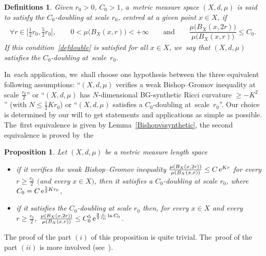 \documentclass[10pt,a4paper]{amsart}
\numberwithin{equation}{section}
\newtheorem{prop}[theor]{Proposition}
\newtheorem{defis}[theor]{Definitions}
\begin{document}
\begin{defis}%
Given $r_0 > 0$, $C_0 > 1$, a~metric measure space $(X,d, \mu)$ is said to satisfy the $C_0$-doubling at scale $r_0$, centred at a given point $x \in X$, if
\begin{gather}\label{defdouble}
\forall r \in \bigg[\frac{1}{2} r_0, \frac{5}{2} r_0\bigg], \qquad
0 < \mu \big(B_X(x, r)\big) < +\infty \qquad
\text{and} \qquad\dfrac{\mu \big(B_X(x, 2 r)\big)}{\mu \big(B_X(x,r)\big)} \le C_0.
\end{gather}
If this condition~\eqref{defdouble} is satisfied for all $ x \in X $, we~say that $ (X,d, \mu) $ satisfies the $C_0$-doubling at~scale~$r_0$.
\end{defis}

\medskip\noindent
{
In~each application, we~shall choose one hypothesis between the three
equivalent following assumptions: ``$(X,d, \mu)$ verifies a weak Bishop--Gromov inequality at scale $\frac{r_0}{2}$'' or
``$(X,d, \mu)$ has $N$-dimensional BG-synthetic Ricci curvature $\ge -K^2\,$'' (with $N \le \frac{1}{2} K r_0$) or ``$(X,d, \mu)$ satisfies a
$C_0$-doubling at~scale~$r_0$''. Our choice is determined by our will to get statements and applications as simple as possible. The~first equivalence is given by Lemma~\ref{Bishopvssynthetic}, the second equivalence is proved by~the

}

\begin{prop}\label{croissanceVol}
Let $(X,d, \mu)$ be a metric measure length space
\begin{itemize}\itemsep=0pt
\item[$(i)$]
if it verifies the weak Bishop--Gromov inequality $\frac{\mu (B_X(x, 2 r))}{\mu(B_X(x,r))} \le C\, {\rm e}^{K r}$ for every $r \ge \frac{r_0}{2}$ $($and every $x \in X)$, then it satisfies a $C_0$-doubling at scale $r_0$, where $C_0 = C\, {\rm e}^{\frac{5}{2} K r_0}$,
\item[$(ii)$]
if it satisfies the $C_0$-doubling at scale $r_0$ then, for every $x \in X$ and every $r \ge \frac{r_0}{2}$, $\frac{\mu (B_X (x,2r))}{\mu (B_X (x,r))} \le C_0^5 \, {\rm e}^{\frac{9}{2} \frac{ r}{r_0}\ln C_0} $.
\end{itemize}
\end{prop}

The proof of the part $(i)$ of this proposition is quite trivial. The~proof
of the part $(ii)$ is more involved (see~\cite{BCGS2}).
\end{document}

